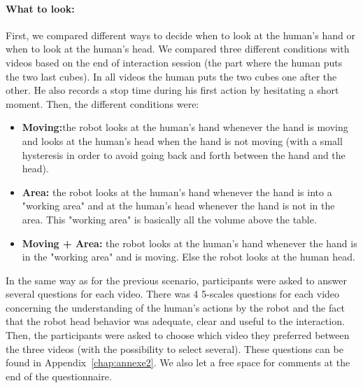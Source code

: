 \documentclass[english,a4paper,11pt,twoside]{StyleThese}
\begin{document}
\paragraph{What to look:} First, we compared different ways to decide when to look at the human's hand or when to look at the human's head. We compared three different conditions with videos based on the end of interaction session (the part where the human puts the two last cubes). In all videos the human puts the two cubes one after the other. He also records a stop time during his first action by hesitating a short moment. Then, the different conditions were:
\begin{itemize}
\item \textbf{Moving:}the robot looks at the human's hand whenever the hand is moving and looks at the human's head when the hand is not moving (with a small hysteresis in order to avoid going back and forth between the hand and the head).
\item \textbf{Area:} the robot looks at the human's hand whenever the hand is into a "working area" and at the human's head whenever the hand is not in the area. This "working area" is basically all the volume above the table.
\item \textbf{Moving + Area:} the robot looks at the human's hand whenever the hand is in the "working area" and is moving. Else the robot looks at the human head.
\end{itemize}

In the same way as for the previous scenario, participants were asked to answer several questions for each video. There was 4 5-scales questions for each video concerning the understanding of the human's actions by the robot and the fact that the robot head behavior was adequate, clear and useful to the interaction. Then, the participants were asked to choose which video they preferred between the three videos (with the possibility to select several). These questions can be found in Appendix~\ref{chap:annexe2}. We also let a free space for comments at the end of the questionnaire.
\end{document}
